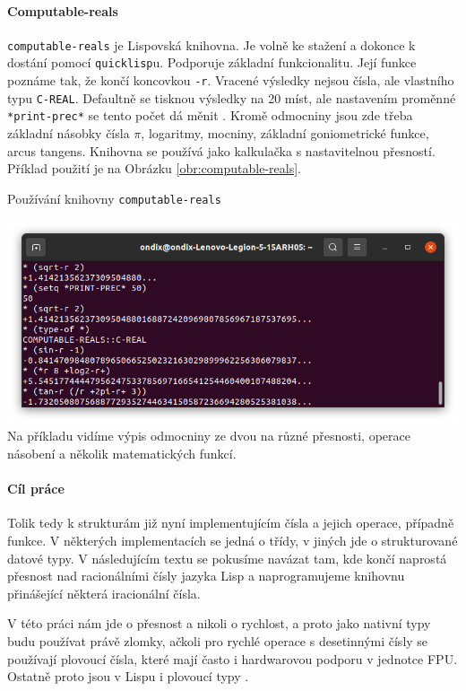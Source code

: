 \paragraph{Computable-reals \cite{gh:cr}}\label{kap:computable-reals}
\texttt{computable-reals} je Lispovská knihovna. Je volně ke stažení a dokonce k dostání pomocí \texttt{quicklisp}u. Podporuje základní funkcionalitu. Její funkce poznáme tak, že končí koncovkou \texttt{-r}. Vracené výsledky nejsou čísla, ale vlastního typu \texttt{C-REAL}. Defaultně se tisknou výsledky na 20 míst, ale nastavením proměnné \texttt{*print-prec*} se tento počet dá měnit \cite{lpb:numbers}. Kromě odmocniny jsou zde třeba základní násobky čísla $\pi$, logaritmy, mocniny, základní goniometrické funkce, arcus tangens. Knihovna se používá jako kalkulačka s nastavitelnou přesností. Příklad použití je na Obrázku \ref{obr:computable-reals}.

\begin{myfigure}{}
\caption{Používání knihovny \texttt{computable-reals}}
\includegraphics[width=\linewidth]{./graphics/computable-reals.png}\label{obr:computable-reals}
Na příkladu vidíme výpis odmocniny ze dvou na různé přesnosti, operace násobení a  několik matematických funkcí.
\end{myfigure}

\paragraph{Cíl práce}
Tolik tedy k strukturám již nyní implementujícím čísla a jejich operace, případně funkce. V některých implementacích se jedná o třídy, v jiných jde o strukturované datové typy. V následujícím textu se pokusíme navázat tam, kde končí naprostá přesnost nad racionálními čísly jazyka Lisp a naprogramujeme knihovnu přinášející některá iracionální čísla.

V této práci nám jde o přesnost a nikoli o rychlost, a proto jako nativní typy budu používat právě zlomky, ačkoli pro rychlé operace s desetinnými čísly se používají plovoucí čísla, které mají často i hardwarovou podporu v jednotce FPU. Ostatně proto jsou v Lispu i plovoucí typy \cite{PS:PCL}.

